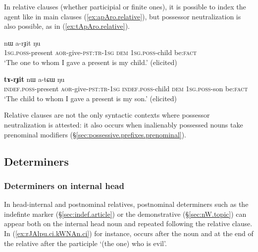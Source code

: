 In relative clauses (whether participial or finite ones), it is possible to index the agent like in main clauses (\ref{ex:apAro.relative}), but  possessor neutralization is also possible, as in (\ref{ex:tApAro.relative}).

\begin{exe}
\ex \label{ex:apAro.relative}
 nɯ a-rɟit ŋu  \\
	\textsc{1sg}.\textsc{poss}-present \textsc{aor}-give-\textsc{pst}:\textsc{tr}-\textsc{1sg} \textsc{dem} \textsc{1sg}.\textsc{poss}-child be:\textsc{fact} \\
\glt `The one to whom I gave a present is my child.' (elicited)
\end{exe} 

\begin{exe}
\ex \label{ex:tApAro.relative}
 \textbf{tɤ-rɟit} nɯ a-tɕɯ ŋu \\
\textsc{indef}.\textsc{poss}-present \textsc{aor}-give-\textsc{pst}:\textsc{tr}-\textsc{1sg} 	\textsc{indef}.\textsc{poss}-child \textsc{dem} \textsc{1sg}.\textsc{poss}-son be:\textsc{fact} \\
\glt `The child to whom I gave a present is my son.' (elicited)
\end{exe} 

Relative clauses are not the only syntactic contexts where possessor neutralization is attested: it also occurs when inalienably possessed nouns take prenominal modifiers (§\ref{sec:possessive.prefixes.prenominal}).


\subsection{Determiners} \label{sec:relative.determiners}

\subsubsection{Determiners on internal head} \label{sec:head-internal.relative.determiners}
In head-internal and postnominal relatives, postnominal determiners such as the indefinte marker  (§\ref{sec:indef.article}) or the demonstrative  (§\ref{sec:nW.topic}) can appear both on the internal head noun and repeated following the relative clause. In (\ref{ex:rJAlpu.ci.kWNAn.ci}) for instance,  occurs after the noun   and at the end of the relative after the participle  `(the one) who is evil'. 

